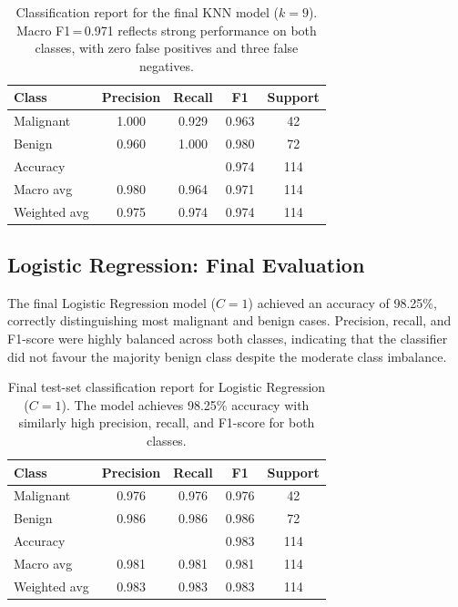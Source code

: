 \documentclass[twocolumn, fontsize=10pt]{article}
\begin{document}
\begin{table}[H]
\centering
\small
\setlength{\tabcolsep}{4pt}
\begin{tabular}{lcccc}
\toprule
\textbf{Class} & \textbf{Precision} & \textbf{Recall} & \textbf{F1} & \textbf{Support} \\
\midrule
Malignant    & 1.000 & 0.929 & 0.963 & 42 \\
Benign       & 0.960 & 1.000 & 0.980 & 72 \\
\midrule
Accuracy     & &  & {0.974} & 114 \\
Macro avg    & 0.980 & 0.964 & 0.971 & 114 \\
Weighted avg & 0.975 & 0.974 & 0.974 & 114 \\
\bottomrule
\end{tabular}
\caption{Classification report for the final KNN model ($k = 9$).
Macro F1\,=\,0.971 reflects strong performance on both classes,
with zero false positives and three false negatives.}
\label{tab:knn_report}
\end{table}



\subsection{Logistic Regression: Final Evaluation}

The final Logistic Regression model ($C = 1$) achieved an accuracy of 98.25\%, correctly distinguishing most malignant and benign cases. Precision, recall, and F1-score were highly balanced across both classes, indicating that the classifier did not favour the majority benign class despite the moderate class imbalance.

\begin{table}[H]
\centering
\small
\setlength{\tabcolsep}{4pt}
\begin{tabular}{lcccc}
\toprule
\textbf{Class} & \textbf{Precision} & \textbf{Recall} & \textbf{F1} & \textbf{Support} \\
\midrule
Malignant    & 0.976 & 0.976 & 0.976 & 42 \\
Benign       & 0.986 & 0.986 & 0.986 & 72 \\
\midrule
Accuracy     & & & {0.983} & 114 \\
Macro avg    & 0.981 & 0.981 & 0.981 & 114 \\
Weighted avg & 0.983 & 0.983 & 0.983 & 114 \\
\bottomrule
\end{tabular}
\caption{Final test-set classification report for Logistic Regression ($C = 1$). The model achieves 98.25\% accuracy with similarly high precision, recall, and F1-score for both classes.}
\label{tab:lr_report}
\end{table}
\end{document}
